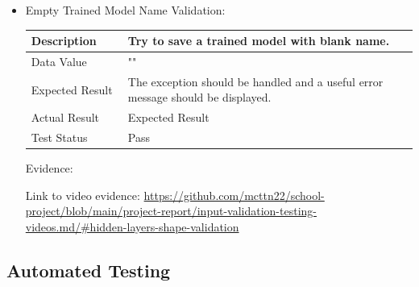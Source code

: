 \documentclass[./project-report/src/latex/project-report.tex]{subfiles}
\begin{document}
\begin{itemize}
\begin{itemize}
        \pagebreak
        
        \item Empty Trained Model Name Validation: \newline\newline
			\begin{tabular}{|p{0.25\linewidth}|p{0.75\linewidth}|}
				\hline
				Description & Try to save a trained model with blank name. \\
				\hline
				Data Value & "" \\
				\hline
				Expected Result & The exception should be handled and a useful error message should be displayed. \\
				\hline
				Actual Result & Expected Result \\
				\hline
				Test Status & Pass \\
				\hline
			\end{tabular}

			\vspace{5mm}

            Evidence:
			\begin{figure}[h!]
			\centering
			\end{figure}

			Link to video evidence: \url{https://github.com/mcttn22/school-project/blob/main/project-report/input-validation-testing-videos.md/#hidden-layers-shape-validation}
    \end{itemize}
\end{itemize}

\subsection{Automated Testing}
\end{document}
